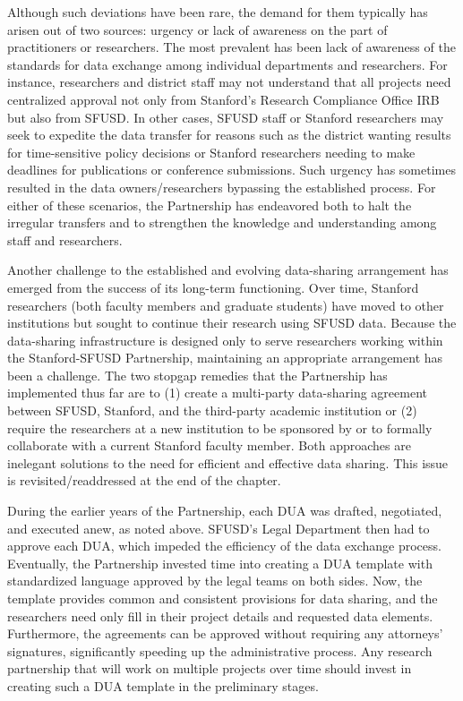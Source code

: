 Although such deviations have been rare, the demand for them typically has arisen out of two sources: urgency or lack of awareness on the part of practitioners or researchers. The most prevalent has been lack of awareness of the standards for data exchange among individual departments and researchers. For instance, researchers and district staff may not understand that all projects need centralized approval not only from Stanford's Research Compliance Office IRB but also from SFUSD. In other cases, SFUSD staff or Stanford researchers may seek to expedite the data transfer for reasons such as the district wanting results for time-sensitive policy decisions or Stanford researchers needing to make deadlines for publications or conference submissions. Such urgency has sometimes resulted in the data owners/researchers bypassing the established process. For either of these scenarios, the Partnership has endeavored both to halt the irregular transfers and to strengthen the knowledge and understanding among staff and researchers.

Another challenge to the established and evolving data-sharing arrangement has emerged from the success of its long-term functioning. Over time, Stanford researchers (both faculty members and graduate students) have moved to other institutions but sought to continue their research using SFUSD data. Because the data-sharing infrastructure is designed only to serve researchers working within the Stanford-SFUSD Partnership, maintaining an appropriate arrangement has been a challenge. The two stopgap remedies that the Partnership has implemented thus far are to (1) create a multi-party data-sharing agreement between SFUSD, Stanford, and the third-party academic institution or (2) require the researchers at a new institution to be sponsored by or to formally collaborate with a current Stanford faculty member. Both approaches are inelegant solutions to the need for efficient and effective data sharing. This issue is revisited/readdressed at the end of the chapter.

During the earlier years of the Partnership, each DUA was drafted, negotiated, and executed anew, as noted above. SFUSD's Legal Department then had to approve each DUA, which impeded the efficiency of the data exchange process. Eventually, the Partnership invested time into creating a DUA template with standardized language approved by the legal teams on both sides. Now, the template provides common and consistent provisions for data sharing, and the researchers need only fill in their project details and requested data elements. Furthermore, the agreements can be approved without requiring any attorneys' signatures, significantly speeding up the administrative process. Any research partnership that will work on multiple projects over time should invest in creating such a DUA template in the preliminary stages.

